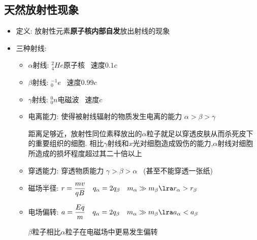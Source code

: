 \documentclass{article}
\begin{document}
\subsection{天然放射性现象}
\begin{itemize}
    \item 定义: 放射性元素\textbf{原子核内部自发}放出射线的现象
    \item 三种射线:
          \begin{itemize}
              \item[] $\alpha$射线: $^{2}_{4}He$原子核 \, 速度$0.1c$
              \item[] $\beta$射线: $^{-1}_{0}e$ \, 速度$0.99c$
              \item[] $\gamma$射线: $^{0}_{0}n$电磁波 \, 速度$c$
              \item[] 电离能力: 使得被射线辐射的物质发生电离的能力 $\alpha > \beta > \gamma$

                  \vspace{-1em}
                  \begin{adjustbox}{minipage=0.91\linewidth, bgcolor=gray!20, padding=1em}
                      \small
                      距离足够近，放射性同位素释放出的$\alpha$粒子就足以穿透皮肤从而杀死皮下的重要组织的细胞.
                      相比$\gamma$射线和$x$光对细胞造成毁伤的能力,$\alpha$射线对细胞所造成的损坏程度超过其二十倍以上
                  \end{adjustbox}
                  \vspace{-1em}

              \item[] 穿透能力: 穿透物质能力 $\gamma > \beta > \alpha$ \, (甚至不能穿透一张纸)
              \item[] 磁场半径: $ r = \dfrac{mv}{qB} \quad q_{\alpha} = 2 q_{\beta}
                      \quad m_{\alpha} \gg m_{\beta} \lra r_{\alpha} > r_{\beta} $
              \item[] 电场偏转: $ a = \dfrac{Eq}{m} \quad q_{\alpha} = 2 q_{\beta}
                      \quad m_{\alpha} \gg m_{\beta} \lra a_{\alpha} < a_{\beta} $

                  \vspace{-1em}
                  \begin{adjustbox}{minipage=0.4\linewidth, bgcolor=gray!20, padding=1em}
                      \small
                      $\beta$粒子相比$\alpha$粒子在电磁场中更易发生偏转
                  \end{adjustbox}
                  \vspace{-1em}
          \end{itemize}
\end{itemize}
\end{document}
